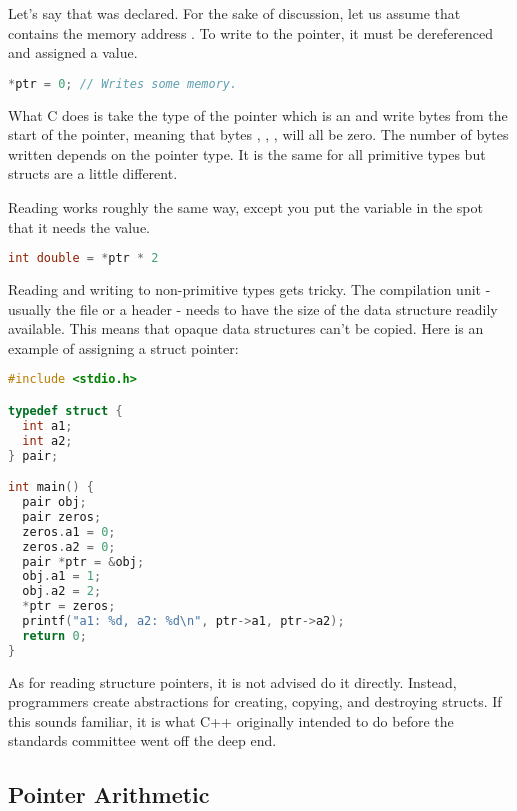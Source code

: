 Let's say that  was declared.
For the sake of discussion, let us assume that  contains the memory address .
To write to the pointer, it must be dereferenced and assigned a value.

\begin{lstlisting}[language=C]
*ptr = 0; // Writes some memory.
\end{lstlisting}

What C does is take the type of the pointer which is an  and write  bytes from the start of the pointer, meaning that bytes , , ,  will all be zero.
The number of bytes written depends on the pointer type.
It is the same for all primitive types but structs are a little different.

Reading works roughly the same way, except you put the variable in the spot that it needs the value.

\begin{lstlisting}[language=C]
int double = *ptr * 2
\end{lstlisting}

Reading and writing to non-primitive types gets tricky.
The compilation unit - usually the file or a header - needs to have the size of the data structure readily available.
This means that opaque data structures can't be copied.
Here is an example of assigning a struct pointer:

\begin{lstlisting}[language=C]
#include <stdio.h>

typedef struct {
  int a1;
  int a2;
} pair;

int main() {
  pair obj;
  pair zeros;
  zeros.a1 = 0;
  zeros.a2 = 0;
  pair *ptr = &obj;
  obj.a1 = 1;
  obj.a2 = 2;
  *ptr = zeros;
  printf("a1: %d, a2: %d\n", ptr->a1, ptr->a2);
  return 0;
}
\end{lstlisting}

As for reading structure pointers, it is not advised do it directly.
Instead, programmers create abstractions for creating, copying, and destroying structs.
If this sounds familiar, it is what C++ originally intended to do before the standards committee went off the deep end.

\subsection{Pointer Arithmetic}

